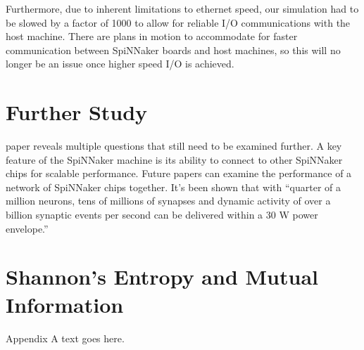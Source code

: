 \documentclass[journal]{./sty/IEEEtran}
\begin{document}
Furthermore, due to inherent limitations to ethernet speed, our simulation had to be slowed by a factor of 1000 to allow for reliable I/O communications with the host machine. There are plans in motion to accommodate for faster communication between SpiNNaker boards and host machines, so this will no longer be an issue once higher speed I/O is achieved.

\section{Further Study}
 paper reveals multiple questions that still need to be examined further. 
A key feature of the SpiNNaker machine is its ability to connect to other SpiNNaker chips for scalable performance.
Future papers can examine the performance of a network of SpiNNaker chips together.
It's been shown that with ``quarter of a million neurons, 
tens of millions of synapses and dynamic activity of over a billion synaptic events per second can be delivered within a 30 W power envelope.''




%


\appendices
\section{Shannon's Entropy and Mutual Information}
Appendix A text goes here.
\end{document}
